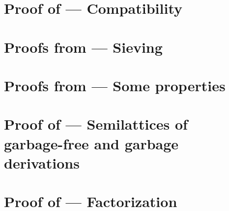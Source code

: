 \section{Proof of  --- Compatibility}
\label{compatibility_of_simulation_residuals_and_permutation_equivalence_proof}


\section{Proofs from  --- Sieving}
\label{sieving_proofs}


\section{Proofs from  --- Some properties}
\label{garbage_some_properties_proof}


\section{Proof of  --- Semilattices of garbage-free and garbage derivations}
\label{semilattices_of_garbage_free_and_garbage_derivations_proof}



\section{Proof of  --- Factorization}
\label{factorization_ulb_derivations_proof}



